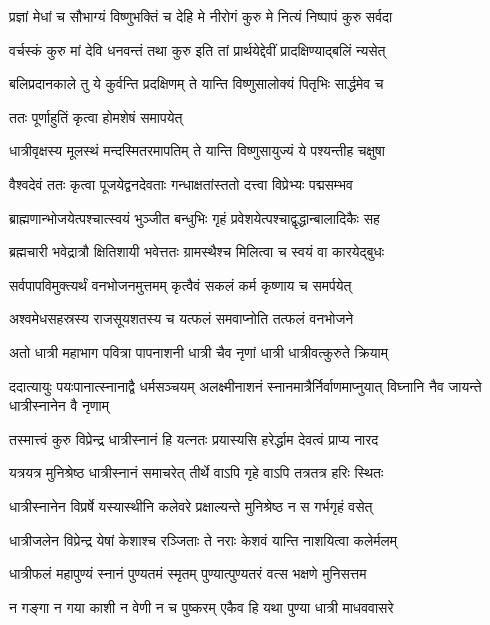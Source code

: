 \twolineshloka
{प्रज्ञां मेधां च सौभाग्यं विष्णुभक्तिं च देहि मे}
{नीरोगं कुरु मे नित्यं निष्पापं कुरु सर्वदा} %

\twolineshloka
{वर्चस्कं कुरु मां देवि धनवन्तं तथा कुरु}
{इति तां प्रार्थयेद्देवीं प्रादक्षिण्याद्बलिं न्यसेत्} %

\twolineshloka
{बलिप्रदानकाले तु ये कुर्वन्ति प्रदक्षिणम्}
{ते यान्ति विष्णुसालोक्यं पितृभिः सार्द्धमेव च} %


\onelineshloka
{ततः पूर्णाहुतिं कृत्वा होमशेषं समापयेत्} %

\twolineshloka
{धात्रीवृक्षस्य मूलस्थं मन्दस्मितरमापतिम्}
{ते यान्ति विष्णुसायुज्यं ये पश्यन्तीह चक्षुषा} %

\twolineshloka
{वैश्वदेवं ततः कृत्वा पूजयेद्वनदेवताः}
{गन्धाक्षतांस्ततो दत्त्वा विप्रेभ्यः पद्मसम्भव} %

\twolineshloka
{ब्राह्मणान्भोजयेत्पश्चात्स्वयं भुञ्जीत बन्धुभिः}
{गृहं प्रवेशयेत्पश्चाद्वृद्धान्बालादिकैः सह} %

\twolineshloka
{ब्रह्मचारी भवेद्रात्रौ क्षितिशायी भवेत्ततः}
{ग्रामस्थैश्च मिलित्वा च स्वयं वा कारयेद्बुधः} %

\twolineshloka
{सर्वपापविमुक्त्यर्थं वनभोजनमुत्तमम्}
{कृत्वैवं सकलं कर्म कृष्णाय च समर्पयेत्} %

\twolineshloka
{अश्वमेधसहस्रस्य राजसूयशतस्य च}
{यत्फलं समवाप्नोति तत्फलं वनभोजने} %

\twolineshloka
{अतो धात्री महाभाग पवित्रा पापनाशनी}
{धात्री चैव नृणां धात्री धात्रीवत्कुरुते क्रियाम्} %

\threelineshloka
{ददात्यायुः पयःपानात्स्नानाद्वै धर्मसञ्चयम्}
{अलक्ष्मीनाशनं स्नानमात्रैर्निर्वाणमाप्नुयात्}
{विघ्नानि नैव जायन्ते धात्रीस्नानेन वै नृणाम्} %

\twolineshloka
{तस्मात्त्वं कुरु विप्रेन्द्र धात्रीस्नानं हि यत्नतः}
{प्रयास्यसि हरेर्द्धाम देवत्वं प्राप्य नारद} %

\twolineshloka
{यत्रयत्र मुनिश्रेष्ठ धात्रीस्नानं समाचरेत्}
{तीर्थे वाऽपि गृहे वाऽपि तत्रतत्र हरिः स्थितः} %

\twolineshloka
{धात्रीस्नानेन विप्रर्षे यस्यास्थीनि कलेवरे}
{प्रक्षाल्यन्ते मुनिश्रेष्ठ न स गर्भगृहं वसेत्} %

\twolineshloka
{धात्रीजलेन विप्रेन्द्र येषां केशाश्च रञ्जिताः}
{ते नराः केशवं यान्ति नाशयित्वा कलेर्मलम्} %

\twolineshloka
{धात्रीफलं महापुण्यं स्नानं पुण्यतमं स्मृतम्}
{पुण्यात्पुण्यतरं वत्स भक्षणे मुनिसत्तम} %

\twolineshloka
{न गङ्गा न गया काशी न वेणी न च पुष्करम्}
{एकैव हि यथा पुण्या धात्री माधववासरे} %

